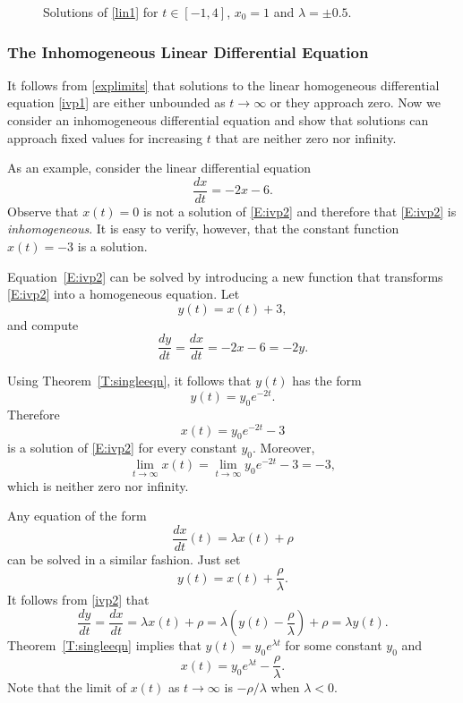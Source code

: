 \documentclass{ximera}
\begin{document}
\begin{figure}[htb]
     \centerline{%
     }
     \caption{Solutions of \protect\eqref{lin1}
              for $t\in [-1,4]$, $x_0=1$ and $\lambda=\pm 0.5$.}
     \label{graph_labelfig}
\end{figure}


  \subsubsection*{The Inhomogeneous Linear Differential Equation}

It follows from \eqref{explimits} that solutions to the linear homogeneous
differential equation \eqref{ivp1} are either unbounded as $t\to \infty$ or 
they approach zero.  Now we consider an inhomogeneous differential 
equation and show that solutions can approach fixed values for increasing 
$t$ that are neither zero nor infinity.

As an example, consider the linear differential equation
\begin{equation} \label{E:ivp2}
\frac{dx}{dt} = -2x-6.
\end{equation}
Observe that $x(t)=0$ is not a solution of \eqref{E:ivp2} and therefore
that \eqref{E:ivp2} is {\em inhomogeneous}.  It is easy to verify, however, 
that the constant function $x(t)=-3$ is a solution.

Equation~\eqref{E:ivp2} can be solved by introducing a new function that 
transforms \eqref{E:ivp2} into a homogeneous equation.  Let
\[
y(t) = x(t) + 3,
\]
and compute
\[
\frac{dy}{dt} = \frac{dx}{dt} = -2x-6 = -2y.
\]

Using Theorem~\ref{T:singleeqn}, it follows that $y(t)$ has the form
\[
y(t) = y_0e^{-2t}.
\]
Therefore
\[
x(t) =  y_0e^{-2t}-3
\]
is a solution of \eqref{E:ivp2} for every constant $y_0$.  Moreover, 
\[
\lim_{t\to\infty} x(t) = \lim_{t\to\infty} y_0e^{-2t} -3=-3,
\]
which is neither zero nor infinity.

Any equation of the form
\begin{equation} \label{ivp2}
\frac{dx}{dt}(t)  = \lambda x(t) +\rho
\end{equation}
can be solved in a similar fashion.  Just set 
\[
y(t) = x(t) + \frac{\rho}{\lambda}.
\]
It follows from \eqref{ivp2} that
\[
\frac{dy}{dt} = \frac{dx}{dt} = \lambda x(t) +\rho =
\lambda\left( y(t)-\frac{\rho}{\lambda}\right) +\rho = \lambda y(t).
\]
Theorem~\ref{T:singleeqn} implies that $y(t) = y_0e^{\lambda t}$ for some 
constant $y_0$ and
\[
x(t) = y_0e^{\lambda t} - \frac{\rho}{\lambda}.
\]
Note that the limit of $x(t)$ as $t\to\infty$ is $-\rho/\lambda$ when 
$\lambda<0$.
\end{document}
